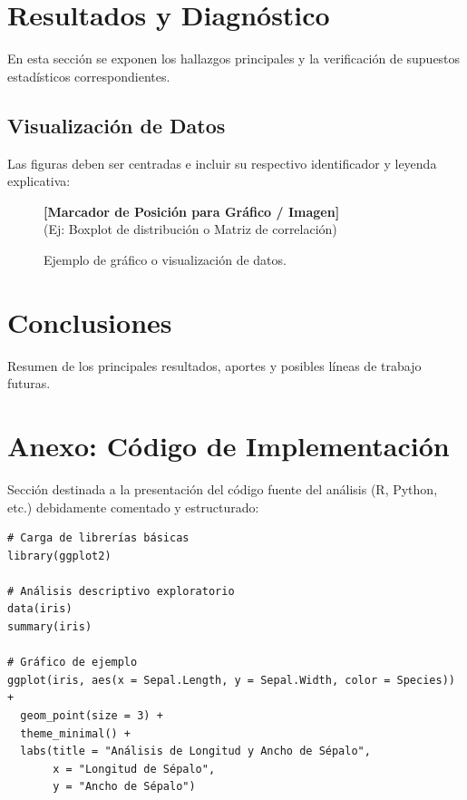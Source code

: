 \documentclass[10pt,a4paper]{article}
\begin{document}
\section{Resultados y Diagnóstico}
En esta sección se exponen los hallazgos principales y la verificación de supuestos estadísticos correspondientes.

\subsection{Visualización de Datos}
Las figuras deben ser centradas e incluir su respectivo identificador y leyenda explicativa:

\begin{figure}[H]
    \centering
    \begin{tcolorbox}[colback=white, colframe=PrimaryBlue, width=0.6\textwidth, halign=center, valign=center, height=4cm]
        \textcolor{PrimaryBlue}{\textbf{[Marcador de Posición para Gráfico / Imagen]}} \\
        (Ej: Boxplot de distribución o Matriz de correlación)
    \end{tcolorbox}
    \caption{Ejemplo de gráfico o visualización de datos.}
    \label{fig:grafico1}
\end{figure}

\section{Conclusiones}
Resumen de los principales resultados, aportes y posibles líneas de trabajo futuras.

\newpage
\section{Anexo: Código de Implementación}
Sección destinada a la presentación del código fuente del análisis (R, Python, etc.) debidamente comentado y estructurado:

\begin{lstlisting}[style=CustomStyle, caption={Script de ejemplo para análisis descriptivo genérico.}]
# Carga de librerías básicas
library(ggplot2)

# Análisis descriptivo exploratorio
data(iris)
summary(iris)

# Gráfico de ejemplo
ggplot(iris, aes(x = Sepal.Length, y = Sepal.Width, color = Species)) +
  geom_point(size = 3) +
  theme_minimal() +
  labs(title = "Análisis de Longitud y Ancho de Sépalo",
       x = "Longitud de Sépalo",
       y = "Ancho de Sépalo")
\end{lstlisting}
\end{document}
